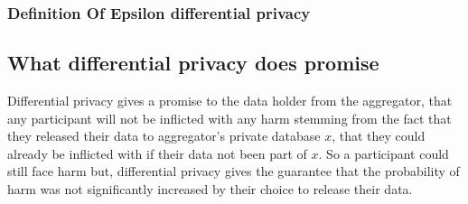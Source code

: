 \documentclass[11pt]{article}
\theoremstyle{definition}
\begin{document}
\subsubsection{Definition Of Epsilon differential privacy}

\subsection{What differential privacy does promise}


Differential privacy gives a promise to the data holder from the aggregator, that any participant will not be inflicted with any harm stemming from the fact that they released their data to aggregator's private database $x$, that they could already be inflicted with if their data not been part of $x$. So a participant could still face harm but, differential privacy gives the guarantee that the probability of harm was not significantly increased by their choice to release their data. %
\end{document}
